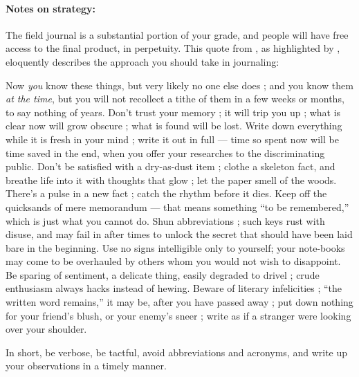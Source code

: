 \documentclass[letterpaper, 11pt]{article}
\begin{document}
\paragraph{Notes on strategy:} The field journal is a substantial portion of your grade, and people will have free access to the final product, in perpetuity. This quote from \citet[][pages 44--45]{bhl86279}, as highlighted by \cite{herman1986naturalist}, eloquently describes the approach you should take in journaling:\vspace{1mm}
\begin{displayquote}\small
Now \textit{you} know these things, but very likely no one else does ; and you know them \textit{at the time}, but you will not recollect a tithe of them in a few weeks or months, to say nothing of years. Don't trust your memory ; it will trip you up ; what is clear now will grow obscure ; what is found will be lost. Write down everything while it is fresh in your mind ; write it out in full --- time so spent now will be time saved in the end, when you offer your researches to the discriminating public. Don't be satisfied with a dry-as-dust item ; clothe a skeleton fact, and breathe life into it with thoughts that glow ; let the paper smell of the woods. There's a pulse in a new fact ; catch the rhythm before it dies. Keep off the quicksands of mere memorandum --- that means something ``to be remembered,'' which is just what you cannot do. Shun abbreviations ; such keys rust with disuse, and may fail in after times to unlock the secret that should have been laid bare in the beginning. Use no signs intelligible only to yourself; your note-books may come to be overhauled by others whom you would not wish to disappoint. Be sparing of sentiment, a delicate thing, easily degraded to drivel ; crude enthusiasm always hacks instead of hewing. Beware of literary infelicities ; ``the written word remains,'' it may be, after you have passed away ; put down nothing for your friend's blush, or your enemy's sneer ; write as if a stranger were looking over your shoulder.
\end{displayquote}
In short, be verbose, be tactful, avoid abbreviations and acronyms, and write up your observations in a timely manner.
\end{document}
